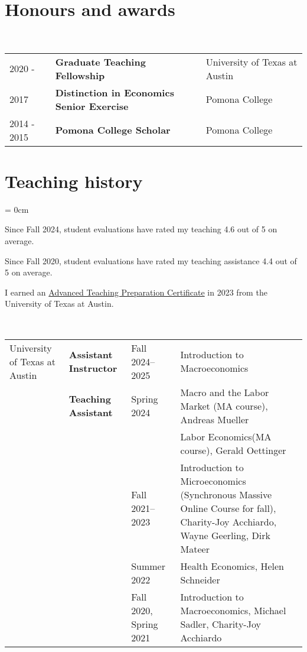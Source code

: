 \documentclass[a4paper, 10pt]{article}
\begin{document}
  \section{Honours and awards}
  ~\begin{tabular}{lll}
    2020 - & \textbf{Graduate Teaching Fellowship} & University of Texas at Austin\\
    2017 & \textbf{Distinction in Economics Senior Exercise} & Pomona College\\
    2014 - 2015 & \textbf{Pomona College Scholar} & Pomona College
  \end{tabular}
  \vspace*{0.25em}

  \section{Teaching history}\label{sec:teaching_history}
  \begin{compactitem}\parskip = 0cm
    \item Since Fall 2024, student evaluations have rated my teaching 4.6 out of 5 on average.
    \item Since Fall 2020, student evaluations have rated my teaching assistance 4.4 out of 5 on average.
    \item I earned an \href{https://ctl.utexas.edu/teaching-preparation-series}{Advanced Teaching Preparation Certificate} in 2023 from the University of Texas at Austin.
  \end{compactitem}
  \vspace*{0.70em}
  ~\begin{tabular}{p{2.3cm} p{3.1cm} p{2.3cm} p{6.4cm}}
    University of \newline Texas at Austin & \textbf{Assistant Instructor} & Fall 2024--2025 & Introduction to Macroeconomics\\
    & \textbf{Teaching Assistant} & Spring 2024 & Macro and the Labor Market \newline (MA course), Andreas Mueller\\
    & & & Labor Economics\newline (MA course), Gerald Oettinger\\
    & & Fall 2021--2023 & Introduction to Microeconomics \newline (Synchronous Massive Online Course for \newline fall), Charity-Joy Acchiardo, Wayne \newline Geerling, Dirk Mateer\\
    & & Summer 2022 & Health Economics, Helen Schneider\\
    & & Fall 2020, \newline Spring 2021 & Introduction to Macroeconomics, \newline Michael Sadler, Charity-Joy Acchiardo
  \end{tabular}
  \vspace*{0.25em}
\end{document}
